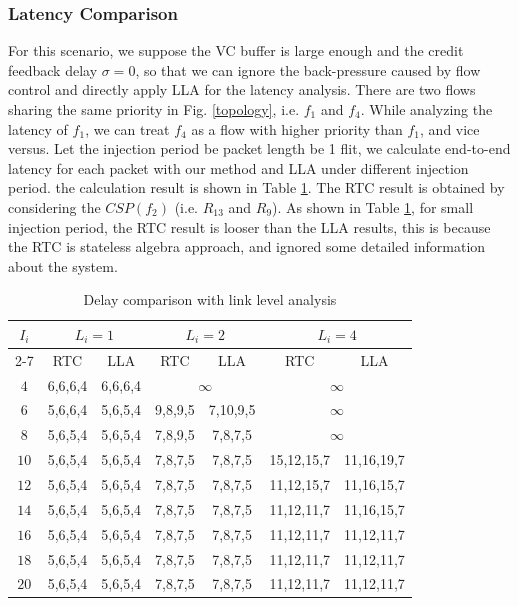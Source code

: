 \documentclass[10pt,journal]{IEEEtran}
\begin{document}
\subsubsection{Latency Comparison}
For this scenario, we suppose the VC buffer is large enough and the credit feedback delay $\sigma=0$, so that we can ignore the back-pressure caused by flow control and directly apply LLA for the latency analysis. There are two flows sharing the same priority in Fig. \ref{topology}, i.e. $f_1$ and $f_4$. While analyzing the latency of $f_1$, we can treat $f_4$ as a flow with higher priority than $f_1$, and vice versus. Let the injection period be packet length be 1 flit, we calculate end-to-end latency for each packet with our method and LLA under different injection period. the calculation result is shown in Table \ref{LLAvsRTC}. The RTC result is obtained by considering the $CSP(f_2)$ (i.e. $R_{13}$ and $R_{9}$). As shown in Table \ref{LLAvsRTC}, for small injection period, the RTC result is looser than the LLA results, this is because the RTC is stateless algebra approach, and ignored some detailed information about the system.
\begin{table}[htbp]
\centering
\caption{\label{LLAvsRTC}Delay comparison with link level analysis}
\begin{tabular}{|c|c|c|c|c|c|c|}
\hline
\multirow{3}{*}{$I_i$}  & \multicolumn{2}{|c|}{$L_i=1$} & \multicolumn{2}{|c|}{$L_i=2$}    &   \multicolumn{2}{|c|}{$L_i=4$} \\
\cline{2-7}
& RTC & LLA & RTC & LLA &   RTC &   LLA\\
\hline
$4$ &   6,6,6,4 &   6,6,6,4 &   \multicolumn{2}{|c|}{$\infty$}   &   \multicolumn{2}{|c|}{$\infty$}\\
\hline
$6$ &   5,6,6,4 &   5,6,5,4 &   9,8,9,5 &   7,10,9,5   &   \multicolumn{2}{|c|}{$\infty$}\\
\hline
$8$ &   5,6,5,4 &   5,6,5,4 &   7,8,9,5 &   7,8,7,5 &   \multicolumn{2}{|c|}{$\infty$}\\
\hline
$10$ &   5,6,5,4 &   5,6,5,4 &   7,8,7,5 &   7,8,7,5 &   15,12,15,7 &   11,16,19,7 \\
\hline
$12$    &   5,6,5,4 &   5,6,5,4 &   7,8,7,5 &   7,8,7,5 &   11,12,15,7  &   11,16,15,7\\
\hline
$14$    &   5,6,5,4 &   5,6,5,4 &   7,8,7,5 &   7,8,7,5 &   11,12,11,7  &   11,16,15,7\\
\hline
$16$    &   5,6,5,4 &   5,6,5,4 &   7,8,7,5 &   7,8,7,5 &   11,12,11,7  &   11,12,11,7\\
\hline
$18$    &   5,6,5,4 &   5,6,5,4 &   7,8,7,5 &   7,8,7,5 &   11,12,11,7  &   11,12,11,7\\
\hline
$20$    &   5,6,5,4 & 5,6,5,4   &   7,8,7,5 &   7,8,7,5 &   11,12,11,7  &   11,12,11,7\\
\hline
\end{tabular}
\end{table}
\end{document}
